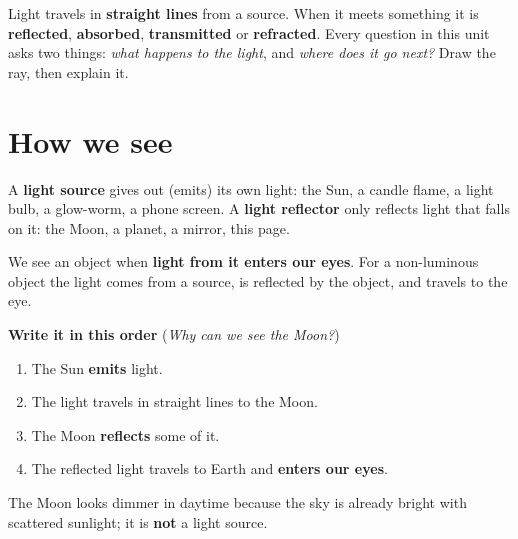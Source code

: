 \documentclass[11pt]{article}
\begin{document}

\begin{keybox}[title=The one idea]
Light travels in \textbf{straight lines} from a source. When it meets something it is \textbf{reflected}, \textbf{absorbed}, \textbf{transmitted} or \textbf{refracted}.
Every question in this unit asks two things: \emph{what happens to the light}, and \emph{where does it go next?} Draw the ray, then explain it.
\end{keybox}

\section{How we see}\label{sec:see}
\begin{minipage}[t]{0.55\textwidth}
\vspace{0pt}
A \textbf{light source} gives out (emits) its own light: the Sun, a candle flame, a light bulb, a glow-worm, a phone screen.
A \textbf{light reflector} only reflects light that falls on it: the Moon, a planet, a mirror, this page.

We see an object when \textbf{light from it enters our eyes}. For a non-luminous object the light comes from a source, is reflected by the object, and travels to the eye.

\textbf{Write it in this order} (\emph{Why can we see the Moon?})
\begin{enumerate}
\item The Sun \textbf{emits} light.
\item The light travels in straight lines to the Moon.
\item The Moon \textbf{reflects} some of it.
\item The reflected light travels to Earth and \textbf{enters our eyes}.
\end{enumerate}
The Moon looks dimmer in daytime because the sky is already bright with scattered sunlight; it is \textbf{not} a light source.
\end{minipage}\hfill
\begin{minipage}[t]{0.42\textwidth}
\vspace{2pt}\centering
\FigHowWeSee[7.2mm]
\end{minipage}
\end{document}
